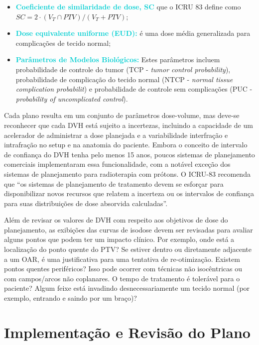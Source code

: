 \documentclass[11pt,a4paper]{article}
\newcounter{exemplo}
\begin{document}
\begin{itemize}[label=\textcolor{CarnationPink}{$\blacktriangleright$}]
		\item \textcolor{DarkTurquoise}{\textbf{Coeficiente de similaridade de dose, SC}} que o ICRU 83 define como $SC = 2 \cdot (V_T \cap PTV) / (V_T + PTV)$;
		
		\item \textcolor{DarkTurquoise}{\textbf{Dose equivalente uniforme (EUD)\cite{niemierko1997reporting}:}} é uma dose média generalizada para complicações de tecido normal;
		
		\item  \textcolor{DarkTurquoise}{\textbf{Parâmetros de Modelos Biológicos:}} Estes parâmetros incluem probabilidade de controle do tumor (TCP - \textit{tumor control probability}), probabilidade de complicação do tecido normal (NTCP - \textit{normal tissue complication probabilit}) e probabilidade de controle sem complicações (PUC - \textit{probability of uncomplicated control}).
	\end{itemize}

	Cada plano resulta em um conjunto de parâmetros dose-volume, mas deve-se reconhecer que cada DVH está sujeito a incertezas, incluindo a capacidade de um acelerador de administrar a dose planejada e a variabilidade  interfração e intrafração no setup e na anatomia do paciente. Embora o conceito de intervalo de confiança do DVH tenha pelo menos 15 anos, poucos sistemas de planejamento comerciais implementaram essa funcionalidade, com a notável exceção dos sistemas de planejamento para radioterapia com prótons. O ICRU-83 recomenda que ``os sistemas de planejamento de tratamento devem se esforçar para disponibilizar novos recursos que relatem a incerteza ou os intervalos de confiança para suas distribuições de dose absorvida calculadas''.

	Além de revisar os valores de DVH com respeito aos objetivos de dose do planejamento, as exibições das curvas de isodose devem ser revisadas para avaliar alguns pontos que podem ter um impacto clínico. Por exemplo, onde está a localização do ponto quente do PTV? Se estiver dentro ou diretamente adjacente a um OAR, é uma justificativa para uma tentativa de re-otimização. Existem pontos quentes periféricos? Isso pode ocorrer com técnicas não isocêntricas ou com  campos/arcos não coplanares. O tempo de tratamento é tolerável para o paciente? Algum feixe está invadindo desnecessariamente um tecido normal (por exemplo, entrando e saindo por um braço)?

\section{Implementação e Revisão do Plano}
\end{document}
